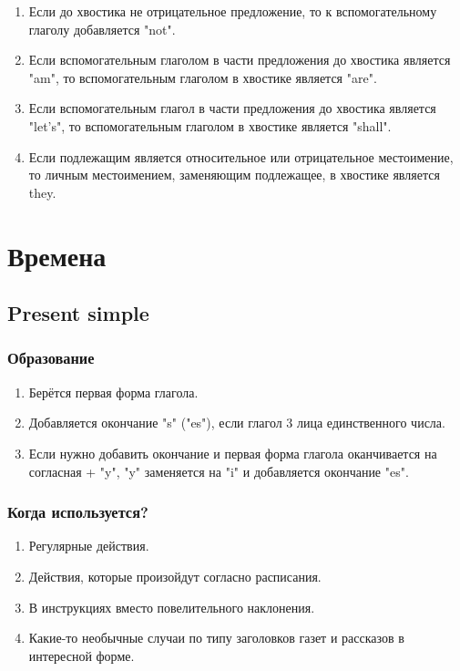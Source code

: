 \documentclass[oneside]{book}
\begin{document}
    \begin{enumerate}
        \item Если до хвостика не отрицательное предложение, то
        к вспомогательному глаголу добавляется "not".

        \item Если вспомогательным глаголом в части предложения
        до хвостика является "am"{}, то вспомогательным глаголом
        в хвостике является "are".

        \item Если вспомогательным глагол в части предложения до
        хвостика является "let's"{}, то вспомогательным глаголом в
        хвостике является "shall".

        \item Если подлежащим является относительное или отрицательное местоимение,
        то личным местоимением, заменяющим подлежащее, в хвостике является they.
    \end{enumerate}

    \chapter{Времена}
    \section{Present simple}
    \subsection{Образование}
    \begin{enumerate}
        \item Берётся первая форма глагола.

        \item Добавляется окончание "s" ("es"), если глагол 3 лица единственного числа.

        \item Если нужно добавить окончание и первая форма глагола
        оканчивается на согласная + "y"{}, "y"{ }заменяется на "i"{ }и
        добавляется окончание "es".
    \end{enumerate}

    \subsection{Когда используется?}
    \begin{enumerate}
        \item Регулярные действия.
        \item Действия, которые произойдут согласно расписания.
        \item В инструкциях вместо повелительного наклонения.
        \item Какие-то необычные случаи по типу заголовков газет и
        рассказов в интересной форме.
    \end{enumerate}
\end{document}
